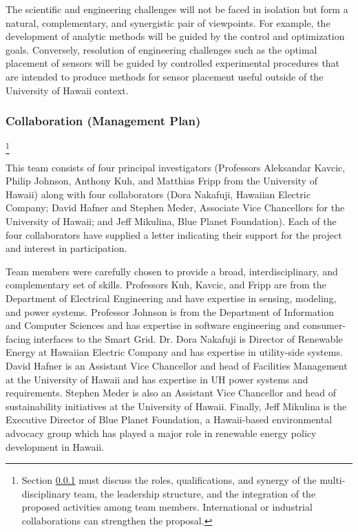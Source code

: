 The scientific and engineering challenges will not be faced in isolation
but form a natural, complementary, and synergistic pair of viewpoints. For
example, the development of analytic methods will be guided by the control
and optimization goals.  Conversely, resolution of engineering challenges
such as the optimal placement of sensors will be guided by controlled
experimental procedures that are intended to produce methods for sensor
placement useful outside of the University of Hawaii context.

\subsubsection{Collaboration (Management Plan)}
\label{sec:collaboration}

\footnote{Section \ref{sec:collaboration} must discuss the roles, qualifications, and
  synergy of the multi-disciplinary team, the leadership structure, and the
  integration of the proposed activities among team members.  
  International or industrial collaborations can strengthen the proposal.
}

This team consists of four principal investigators (Professors Aleksandar
Kavcic, Philip Johnson, Anthony Kuh, and Matthias Fripp from the University
of Hawaii) along with four collaborators (Dora Nakafuji, Hawaiian Electric
Company; David Hafner and Stephen Meder, Associate Vice Chancellors for the
University of Hawaii; and Jeff Mikulina, Blue Planet Foundation).  Each of
the four collaborators have supplied a letter indicating their support for
the project and interest in participation.

Team members were carefully chosen to provide a broad, interdisciplinary,
and complementary set of skills. Professors Kuh, Kavcic, and Fripp are from
the Department of Electrical Engineering and have expertise in sensing,
modeling, and power systems.  Professor Johnson is from the Department of
Information and Computer Sciences and has expertise in software engineering
and consumer-facing interfaces to the Smart Grid.  Dr. Dora Nakafuji is Director of
Renewable Energy at Hawaiian Electric Company and has expertise in
utility-side systems. David Hafner is an Assistant Vice Chancellor and head
of Facilities Management at the University of Hawaii and has expertise in
UH power systems and requirements.  Stephen Meder is also an Assistant Vice
Chancellor and head of sustainability initiatives at the University of
Hawaii.  Finally, Jeff Mikulina is the Executive Director of Blue Planet
Foundation, a Hawaii-based environmental advocacy group which has played a
major role in renewable energy policy development in Hawaii.

